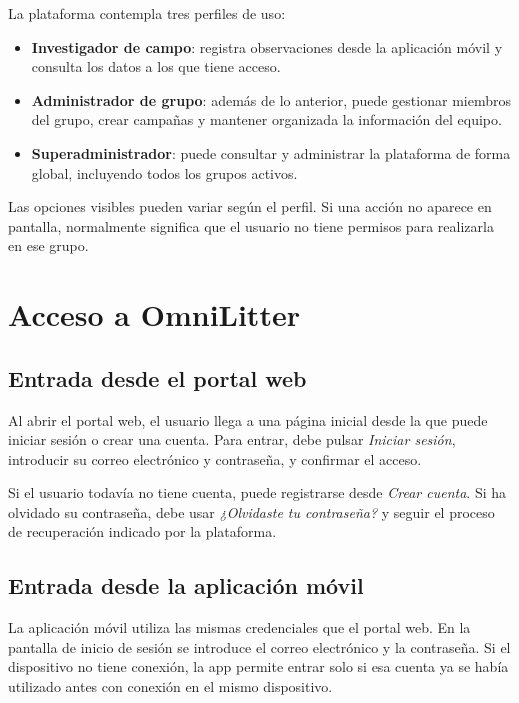 La plataforma contempla tres perfiles de uso:

\begin{itemize}[leftmargin=1.5em]
  \item \textbf{Investigador de campo}: registra observaciones desde la aplicación
  móvil y consulta los datos a los que tiene acceso.
  \item \textbf{Administrador de grupo}: además de lo anterior, puede gestionar
  miembros del grupo, crear campañas y mantener organizada la información del equipo.
  \item \textbf{Superadministrador}: puede consultar y administrar la plataforma de
  forma global, incluyendo todos los grupos activos.
\end{itemize}

Las opciones visibles pueden variar según el perfil. Si una acción no aparece en
pantalla, normalmente significa que el usuario no tiene permisos para realizarla en
ese grupo.

\section{Acceso a OmniLitter}

\subsection{Entrada desde el portal web}

Al abrir el portal web, el usuario llega a una página inicial desde la que puede
iniciar sesión o crear una cuenta. Para entrar, debe pulsar \textit{Iniciar sesión},
introducir su correo electrónico y contraseña, y confirmar el acceso.


Si el usuario todavía no tiene cuenta, puede registrarse desde \textit{Crear cuenta}.
Si ha olvidado su contraseña, debe usar \textit{¿Olvidaste tu contraseña?} y seguir
el proceso de recuperación indicado por la plataforma.


\subsection{Entrada desde la aplicación móvil}

La aplicación móvil utiliza las mismas credenciales que el portal web. En la pantalla
de inicio de sesión se introduce el correo electrónico y la contraseña. Si el
dispositivo no tiene conexión, la app permite entrar solo si esa cuenta ya se había
utilizado antes con conexión en el mismo dispositivo.

